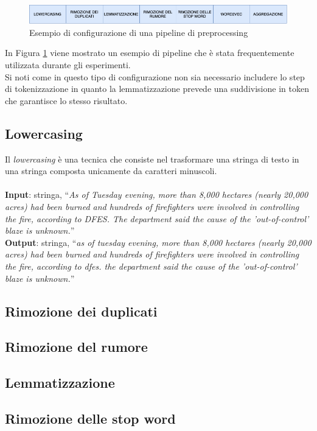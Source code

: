 \documentclass[12pt]{report}
\theoremstyle{definition}
\begin{document}
\begin{figure}
    \centering
    \includegraphics[scale=0.5]{images/pipeline.png}
    \caption{Esempio di configurazione di una pipeline di preprocessing}
    \label{pipeline}
\end{figure}

In Figura \ref{pipeline} viene mostrato un esempio di pipeline che è stata frequentemente utilizzata durante gli esperimenti.
\\
Si noti come in questo tipo di configurazione non sia necessario includere lo step di tokenizzazione in quanto la lemmatizzazione prevede una suddivisione in token che garantisce lo stesso risultato.

\subsection{Lowercasing}
Il \textit{lowercasing} è una tecnica che consiste nel trasformare una stringa di testo in una stringa composta unicamente da caratteri minuscoli.
\\
\\
\textbf{Input}: stringa, ``\textit{As of Tuesday evening, more than 8,000 hectares (nearly 20,000 acres) had been burned and hundreds of firefighters were involved in controlling the fire, according to DFES. The department said the cause of the 'out-of-control' blaze is unknown.}''
\\
\textbf{Output}: stringa, ``\textit{as of tuesday evening, more than 8,000 hectares (nearly 20,000 acres) had been burned and hundreds of firefighters were involved in controlling the fire, according to dfes. the department said the cause of the 'out-of-control' blaze is unknown.}''

\subsection{Rimozione dei duplicati}

\subsection{Rimozione del rumore}
\subsection{Lemmatizzazione}
\subsection{Rimozione delle stop word}
\end{document}
